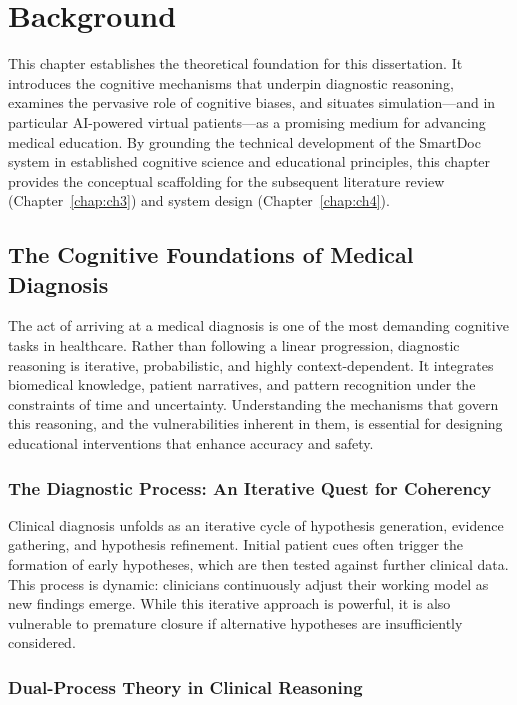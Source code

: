 \chapter{Background} \label{chap:ch2}

This chapter establishes the theoretical foundation for this dissertation. It introduces the cognitive mechanisms that underpin diagnostic reasoning, examines the pervasive role of cognitive biases, and situates simulation---and in particular AI-powered virtual patients---as a promising medium for advancing medical education. By grounding the technical development of the SmartDoc system in established cognitive science and educational principles, this chapter provides the conceptual scaffolding for the subsequent literature review (Chapter~\ref{chap:ch3}) and system design (Chapter~\ref{chap:ch4}).

\section{The Cognitive Foundations of Medical Diagnosis}

The act of arriving at a medical diagnosis is one of the most demanding cognitive tasks in healthcare. Rather than following a linear progression, diagnostic reasoning is iterative, probabilistic, and highly context-dependent. It integrates biomedical knowledge, patient narratives, and pattern recognition under the constraints of time and uncertainty. Understanding the mechanisms that govern this reasoning, and the vulnerabilities inherent in them, is essential for designing educational interventions that enhance accuracy and safety.

\subsection{The Diagnostic Process: An Iterative Quest for Coherency} \label{sec:se211}

Clinical diagnosis unfolds as an iterative cycle of hypothesis generation, evidence gathering, and hypothesis refinement. Initial patient cues often trigger the formation of early hypotheses, which are then tested against further clinical data. This process is dynamic: clinicians continuously adjust their working model as new findings emerge. While this iterative approach is powerful, it is also vulnerable to premature closure if alternative hypotheses are insufficiently considered.

\subsection{Dual-Process Theory in Clinical Reasoning} \label{sec:se311}


